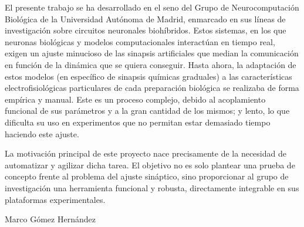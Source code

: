 El presente trabajo se ha desarrollado en el seno del Grupo de Neurocomputación Biológica de la Universidad Autónoma de Madrid, enmarcado en sus líneas de investigación sobre circuitos neuronales biohíbridos. Estos sistemas, en los que neuronas biológicas y modelos computacionales interactúan en tiempo real, exigen un ajuste minucioso de las sinapsis artificiales que median la comunicación en función de la dinámica que se quiera conseguir. Hasta ahora, la adaptación de estos modelos (en específico de sinapsis químicas graduales) a las características electrofisiológicas particulares de cada preparación biológica se realizaba de forma empírica y manual. Este es un proceso complejo, debido al acoplamiento funcional de sus parámetros y a la gran cantidad de los mismos; y lento, lo que dificulta su uso en experimentos que no permitan estar demasiado tiempo haciendo este ajuste.

La motivación principal de este proyecto nace precisamente de la necesidad de automatizar y agilizar dicha tarea. El objetivo no es solo plantear una prueba de concepto frente al problema del ajuste sináptico, sino proporcionar al grupo de investigación una herramienta funcional y robusta, directamente integrable en sus plataformas experimentales.

\hfill \begin{flushright}Marco Gómez Hernández\end{flushright}\hfill

